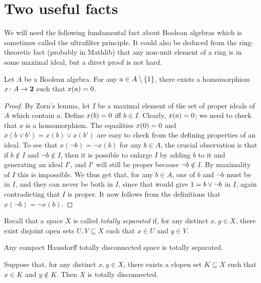 \chapter{Two useful facts}
We will need the following fundamental fact about Boolean algebras which is
sometimes called the ultrafilter principle. It could also be deduced from the
ring-theoretic fact (probably in Mathlib) that any non-unit element of a ring
is in some maximal ideal, but a direct proof is not hard.
\begin{lemma}\label{ultrafilterprinciple}
    Let $A$ be a Boolean algebra. For any $a \in A \setminus \{1\}$, 
    there exists a homomorphism $x \colon A \to \mathbf{2}$ such that $x(a) =
    0$.
\end{lemma}
\begin{proof}
    By Zorn's lemma, let $I$ be a maximal element of the set of proper ideals
    of $A$ which contain $a$. Define $x(b) = 0$ iff $b \in I$. Clearly,
    $x(a) = 0$; we need to check that $x$ is a homomorphism. The equalities
    $x(0) = 0$ and $x(b \vee b') = x(b) \vee x(b')$ are easy to check
    from the defining properties of an ideal. To see that $x(\neg b) = \neg
    x(b)$ for any $b \in A$, the crucial observation is that if $b \not\in I$
    and $\neg b \not\in I$, then it is possible to enlarge $I$ by adding $b$ to
    it and generating an ideal $I'$, and $I'$ will still be proper because
    $\neg b \not\in I$. By maximality of $I$ this is impossible.  We thus get
    that, for any $b \in A$, one of $b$ and $\neg b$ must be in $I$, and they
    can never be both in $I$, since that would give $1 = b \vee \neg b$ in
    $I$, again contradicting that $I$ is proper. It now follows from the
    definitions that $x(\neg b) = \neg x(b)$.
\end{proof}

Recall that a space $X$ is called \emph{totally separated} if, for any distinct $x,y \in X$, there exist disjoint open sets $U, V \subseteq X$ such that $x \in U$ and $y \in V$.
\begin{lemma} \leanok \label{KTDimpliesTotSep}
    Any compact Hausdorff totally disconnected space is totally separated.
\end{lemma}


\begin{lemma}\leanok
    Suppose that, for any distinct $x,y \in X$, there exists a clopen set $K \subseteq X$ such that $x \in K$ and $y \not\in K$. Then $X$ is totally disconnected.
\end{lemma}

